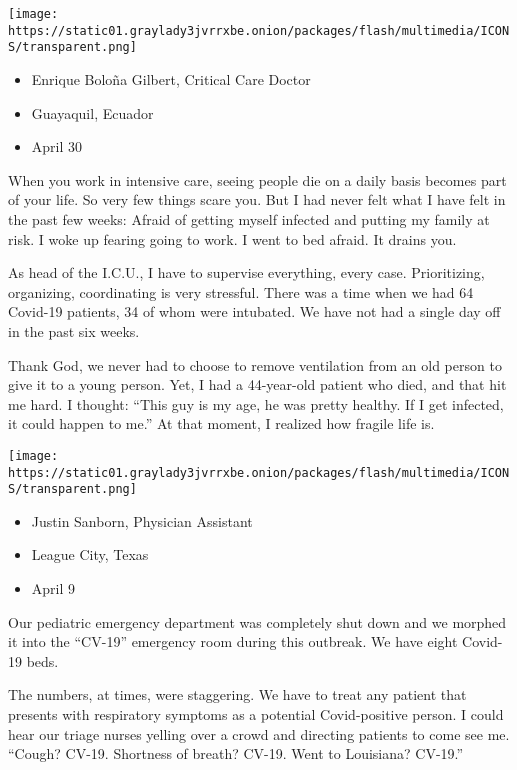 \texttt{[image: https://static01.graylady3jvrrxbe.onion/packages/flash/multimedia/ICONS/transparent.png]}

\begin{itemize}
\tightlist
\item
  Enrique Boloña Gilbert, Critical Care Doctor
\item
  Guayaquil, Ecuador
\item
  April 30
\end{itemize}

When you work in intensive care, seeing people die on a daily basis
becomes part of your life. So very few things scare you. But I had never
felt what I have felt in the past few weeks: Afraid of getting myself
infected and putting my family at risk. I woke up fearing going to work.
I went to bed afraid. It drains you.

As head of the I.C.U., I have to supervise everything, every case.
Prioritizing, organizing, coordinating is very stressful. There was a
time when we had 64 Covid-19 patients, 34 of whom were intubated. We
have not had a single day off in the past six weeks.

Thank God, we never had to choose to remove ventilation from an old
person to give it to a young person. Yet, I had a 44-year-old patient
who died, and that hit me hard. I thought: ``This guy is my age, he was
pretty healthy. If I get infected, it could happen to me.'' At that
moment, I realized how fragile life is.

\texttt{[image: https://static01.graylady3jvrrxbe.onion/packages/flash/multimedia/ICONS/transparent.png]}

\begin{itemize}
\tightlist
\item
  Justin Sanborn, Physician Assistant
\item
  League City, Texas
\item
  April 9
\end{itemize}

Our pediatric emergency department was completely shut down and we
morphed it into the ``CV-19'' emergency room during this outbreak. We
have eight Covid-19 beds.

The numbers, at times, were staggering. We have to treat any patient
that presents with respiratory symptoms as a potential Covid-positive
person. I could hear our triage nurses yelling over a crowd and
directing patients to come see me. ``Cough? CV-19. Shortness of breath?
CV-19. Went to Louisiana? CV-19.''

